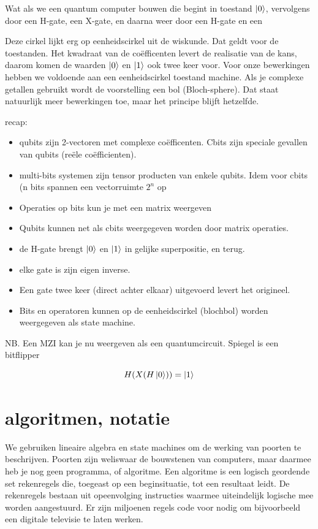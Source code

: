 \documentclass[../../main.tex]{subfiles}
\begin{document}
Wat als we een quantum computer bouwen die begint in toestand $\ket{0}$, vervolgens door een H-gate, een X-gate, en daarna weer door een H-gate en een 

Deze cirkel lijkt erg op eenheidscirkel uit de wiskunde. Dat geldt voor de toestanden. Het kwadraat van de co\"efficenten levert de realisatie van de kans, daarom komen de waarden $\ket{0}$ en $\ket{1}$ ook twee keer voor. Voor onze bewerkingen hebben we voldoende aan een eenheidscirkel toestand machine. Als je complexe getallen gebruikt wordt de voorstelling een bol (Bloch-sphere). Dat staat natuurlijk meer bewerkingen toe, maar het principe blijft hetzelfde.

recap:
\begin{itemize}[nosep]
\item  qubits zijn 2-vectoren met complexe co\"efficenten. Cbits zijn speciale gevallen van qubits (re\"ele co\"efficienten).
\item multi-bits systemen zijn tensor producten van enkele qubits. Idem voor cbits (n bits spannen een vectorruimte $2^n$ op 
\item Operaties op bits kun je met een matrix weergeven
\item Qubits kunnen net als cbits weergegeven worden door matrix operaties.
\item de H-gate brengt $\ket{0}$
en $\ket{1}$ in gelijke superpositie, en terug.
\item elke gate is zijn eigen inverse.
\item Een gate twee keer (direct achter elkaar) uitgevoerd levert het origineel. 
\item Bits en operatoren kunnen op de eenheidscirkel (blochbol) worden weergegeven als state machine.
\end{itemize}

NB. Een MZI kan je nu weergeven als een quantumcircuit. Spiegel is een bitflipper

$$H(X(H\ket{0}))=\ket{1}$$

\section{algoritmen, notatie}
We gebruiken lineaire algebra en state machines om de werking van poorten te beschrijven. Poorten zijn weliswaar de bouwstenen van computers, maar daarmee heb je nog geen programma, of algoritme. Een algoritme is een logisch geordende set rekenregels die, toegeast op een beginsituatie, tot een resultaat leidt. De rekenregels bestaan uit opeenvolging instructies waarmee uiteindelijk logische mee worden aangestuurd. Er zijn miljoenen regels code voor nodig om bijvoorbeeld een digitale televisie te laten werken. 
\end{document}
